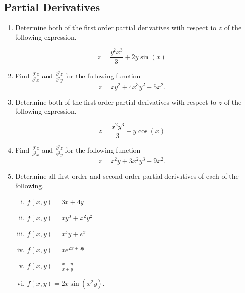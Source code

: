 \documentclass[a4paper,12pt]{article}
\begin{document}
\subsection*{Partial Derivatives}
\begin{enumerate}

\item Determine both of the first order partial derivatives with respect to $z$ of the following expression.

\[ z = \frac{y^2x^3}{3} +  2y \sin(x)\]
 

\item Find $\displaystyle{ \frac{ \partial^2 z }{ \partial^2 x  }}$ and $\displaystyle{ \frac{ \partial^2 z }{ \partial^2 y }}$  for the following function
	\[ z = xy^2 + 4x^3y^2 + 5x^2.\]	

	
	\item Determine both of the first order partial derivatives with respect to $z$ of the following expression.

\[ z = \frac{x^2y^3}{3} +  y \cos(x)\]
 

	\item Find $\displaystyle{ \frac{ \partial^2 z }{ \partial^2 x  }}$ and $\displaystyle{ \frac{ \partial^2 z }{ \partial^2 y }}$  for the following function
	\[ z = x^2y + 3x^2y^3 - 9x^2.\]	

\item 
Determine all first order and second order partial derivatives of each of the following.
\begin{multicols}{2}
	\begin{enumerate}[(i)]
		
		\item $\displaystyle{f(x, y) = 3x + 4y}$
		
		\item $\displaystyle{f(x, y) = xy^3 + x^2y^2}$
		\item $\displaystyle{f(x, y) = x^3y + e^x}$
		
		\item $\displaystyle{f(x, y) = xe^{2x+3y}}$
		
			\item $\displaystyle{f(x, y) = \frac{x - y}{x+y}} $
		
		\item $\displaystyle{f(x, y) = 2x \sin(x^2y)}$.
		
		
	\end{enumerate}
\end{multicols}




\end{enumerate}
\end{document}
